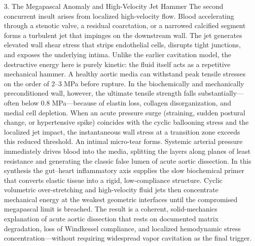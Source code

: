 3. The Megapascal Anomaly and High-Velocity Jet Hammer
The second concurrent insult arises from localized high-velocity flow. Blood accelerating through a stenotic valve, a residual coarctation, or a narrowed calcified segment forms a turbulent jet that impinges on the downstream wall. The jet generates elevated wall shear stress that strips endothelial cells, disrupts tight junctions, and exposes the underlying intima. Unlike the earlier cavitation model, the destructive energy here is purely kinetic: the fluid itself acts as a repetitive mechanical hammer.
A healthy aortic media can withstand peak tensile stresses on the order of 2–3 MPa before rupture. In the biochemically and mechanically preconditioned wall, however, the ultimate tensile strength falls substantially—often below 0.8 MPa—because of elastin loss, collagen disorganization, and medial cell depletion. When an acute pressure surge (straining, sudden postural change, or hypertensive spike) coincides with the cyclic ballooning stress and the localized jet impact, the instantaneous wall stress at a transition zone exceeds this reduced threshold. An intimal micro-tear forms. Systemic arterial pressure immediately drives blood into the media, splitting the layers along planes of least resistance and generating the classic false lumen of acute aortic dissection.
In this synthesis the gut–heart inflammatory axis supplies the slow biochemical primer that converts elastic tissue into a rigid, low-compliance structure. Cyclic volumetric over-stretching and high-velocity fluid jets then concentrate mechanical energy at the weakest geometric interfaces until the compromised megapascal limit is breached. The result is a coherent, solid-mechanics explanation of acute aortic dissection that rests on documented matrix degradation, loss of Windkessel compliance, and localized hemodynamic stress concentration—without requiring widespread vapor cavitation as the final trigger.
